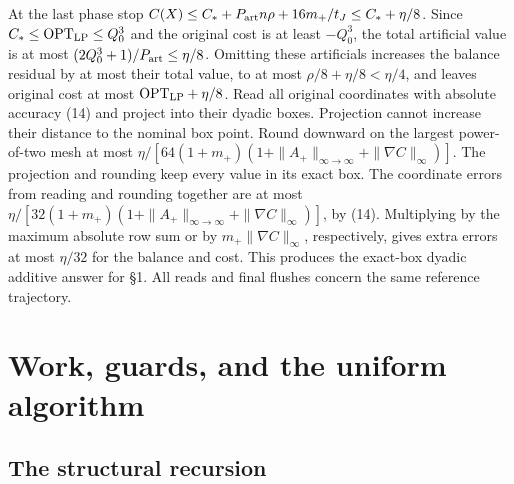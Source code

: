 \documentclass[11pt]{article}
\begin{document}
At the last phase stop \(C(X)\le C_*+P_{\rm art}n\rho+16m_+/t_J\le C_*+\eta/8\). Since \(C_*\le\mathrm{OPT}_{\rm LP}\le Q_0^3\) and the original cost is at least \(-Q_0^3\), the total artificial value is at most \((2Q_0^3+1)/P_{\rm art}\le\eta/8\). Omitting these artificials increases the balance residual by at most their total value, to at most \(\rho/8+\eta/8<\eta/4\), and leaves original cost at most \(\mathrm{OPT}_{\rm LP}+\eta/8\). Read all original coordinates with absolute accuracy (14) and project into their dyadic boxes. Projection cannot increase their distance to the nominal box point. Round downward on the largest power-of-two mesh at most \(\eta/[64(1+m_+)(1+\|A_+\|_{\infty\to\infty}+\|\nabla C\|_\infty)]\). The projection and rounding keep every value in its exact box. The coordinate errors from reading and rounding together are at most \(\eta/[32(1+m_+)(1+\|A_+\|_{\infty\to\infty}+\|\nabla C\|_\infty)]\), by (14). Multiplying by the maximum absolute row sum or by \(m_+\|\nabla C\|_\infty\), respectively, gives extra errors at most \(\eta/32\) for the balance and cost. This produces the exact-box dyadic additive answer for §1. All reads and final flushes concern the same reference trajectory.

\hypertarget{work-guards-and-the-uniform-algorithm}{%
\section{Work, guards, and the uniform algorithm}\label{work-guards-and-the-uniform-algorithm}}

\hypertarget{the-structural-recursion}{%
\subsection{The structural recursion}\label{the-structural-recursion}}
\end{document}
